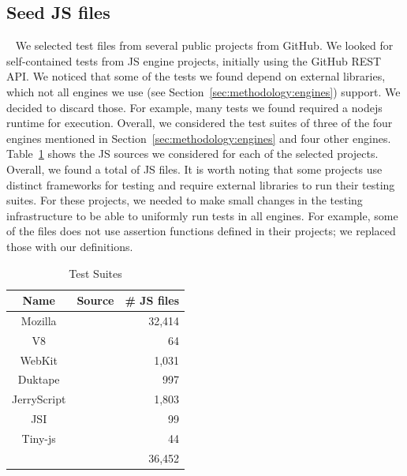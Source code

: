 \documentclass[10pt,conference,anonymous]{IEEEtran}
\begin{document}
\subsection{Seed JS files\label{sec:seeds}}~
We selected test files from several public projects from GitHub. We
looked for self-contained tests from JS engine projects, initially
using the GitHub REST API. We noticed that some of the tests
we found depend on external libraries, which not all engines we use
(see Section~\ref{sec:methodology:engines}) support. We decided to
discard those. For example, many tests we found required a
nodejs runtime for execution. Overall, we considered the
test suites of three of the four engines mentioned in
Section~\ref{sec:methodology:engines} and four other engines.
Table~\ref{tab:test-suites} shows the JS sources we considered for
each of the selected projects. Overall, we found a total of
\totfiles{} JS files. It is worth noting that some projects use
distinct frameworks for testing and require external libraries to run
their testing suites. 
For these projects, we needed to make small
changes in the testing infrastructure to be able to uniformly run
tests in all engines. For example, some of the files does not use assertion 
functions defined in their projects; we replaced those with our definitions.

\begin{table}[t]
  \centering
  \caption{\label{tab:test-suites}Test Suites
  }
  \begin{tabular}{ccr}
    \toprule
    Name & Source & \# JS files \\
    \midrule
    Mozilla & \cite{mozilla} & 32,414 \\
    V8 & \cite{v8} & 64 \\
    WebKit & \cite{webkit} & 1,031 \\
    \midrule    
    Duktape & \cite{duktape} & 997 \\
    JerryScript & \cite{jerryscript} & 1,803 \\
    JSI & \cite{jsi} & 99 \\
    Tiny-js & \cite{tinyjs} & 44 \\    
    \midrule
     &  & 36,452 \\
   \bottomrule     
  \end{tabular}
\end{table}
\end{document}
